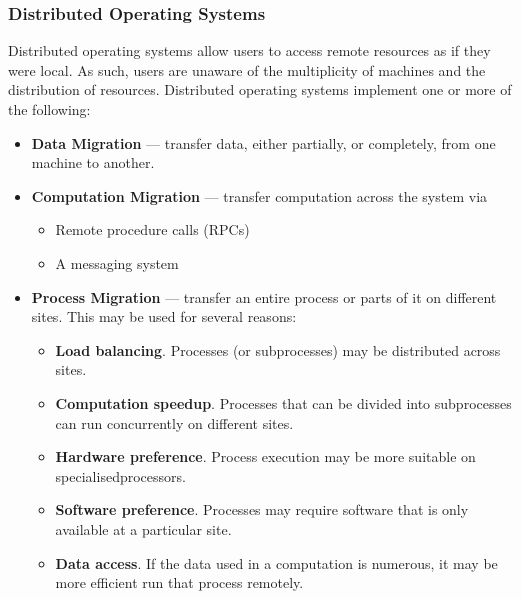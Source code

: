 \documentclass{article}
\begin{document}
\subsubsection{Distributed Operating Systems}
Distributed operating systems allow users to access remote resources as
if they were local. As such, users are unaware of the multiplicity of
machines and the distribution of resources. Distributed operating
systems implement one or more of the following:
\begin{itemize}
    \item \textbf{Data Migration} --- transfer data, either partially,
          or completely, from one machine to another.
    \item \textbf{Computation Migration} --- transfer computation across
          the system via
          \begin{itemize}
              \item Remote procedure calls (RPCs)
              \item A messaging system
          \end{itemize}
    \item \textbf{Process Migration} --- transfer an entire process
          or parts of it on different sites. This may be used for several
          reasons:
          \begin{itemize}
              \item \textbf{Load balancing}. Processes (or
                    subprocesses) may be distributed across sites.
              \item \textbf{Computation speedup}. Processes that can
                    be divided into subprocesses can run concurrently on
                    different sites.
              \item \textbf{Hardware preference}. Process execution
                    may be more suitable on specialised\linebreak processors.
              \item \textbf{Software preference}. Processes may
                    require software that is only available at a
                    particular site.
              \item \textbf{Data access}. If the data used in a
                    computation is numerous, it may be more efficient
                    run that process remotely.
          \end{itemize}
\end{itemize}
\end{document}
